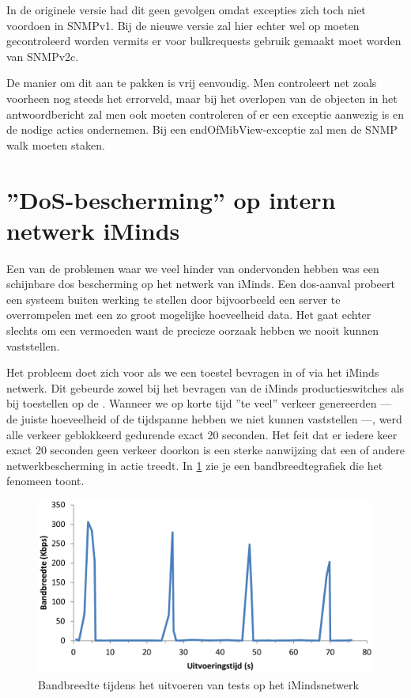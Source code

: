 In de originele versie had dit geen gevolgen omdat excepties zich toch niet voordoen in SNMPv1.
Bij de nieuwe versie zal hier echter wel op moeten gecontroleerd worden vermits er voor bulkrequests gebruik gemaakt moet worden van SNMPv2c.

De manier om dit aan te pakken is vrij eenvoudig.
Men controleert net zoals voorheen nog steeds het errorveld, maar bij het overlopen van de objecten in het antwoordbericht
zal men ook moeten controleren of er een exceptie aanwezig is en de nodige acties ondernemen.
Bij een endOfMibView-exceptie zal men de SNMP walk moeten staken.


\section{''DoS-bescherming'' op intern netwerk iMinds}
\label{probleem-dos-bescherming}


Een van de problemen waar we veel hinder van ondervonden hebben was een schijnbare \gls{dos} bescherming op het netwerk van iMinds.
Een \gls{dos}-aanval probeert een systeem buiten werking te stellen door bijvoorbeeld een server te overrompelen met een zo groot mogelijke hoeveelheid data.
Het gaat echter slechts om een vermoeden want de precieze oorzaak hebben we nooit kunnen vaststellen.

Het probleem doet zich voor als we een toestel bevragen in of via het iMinds netwerk.
Dit gebeurde zowel bij het bevragen van de iMinds productieswitches als bij toestellen op de \vwall{}.
Wanneer we op korte tijd ''te veel'' verkeer genereerden --- de juiste hoeveelheid of de tijdspanne hebben we niet kunnen vaststellen ---,
werd alle verkeer geblokkeerd gedurende exact 20 seconden.
Het feit dat er iedere keer exact 20 seconden geen verkeer doorkon is een sterke aanwijzing dat een of andere netwerkbescherming in actie treedt.
In \cref{fig-dos-bescherming} zie je een bandbreedtegrafiek die het fenomeen toont.

\begin{figure}[h]
	\centering
	\includegraphics[scale=0.40]{figures/dos-bescherming}
	\caption{Bandbreedte tijdens het uitvoeren van tests op het iMindsnetwerk}
	\label{fig-dos-bescherming}
\end{figure}

